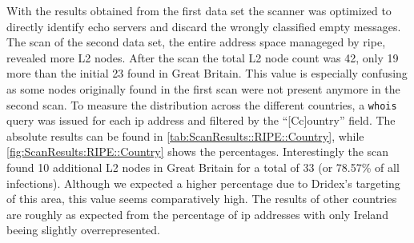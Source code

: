 With the results obtained from the first data set the scanner was optimized to directly identify echo servers and discard the wrongly classified empty messages.
The scan of the second data set, the entire address space manageged by \gls{ripe}, revealed more L2 nodes.
After the scan the total L2 node count was 42, only 19 more than the initial 23 found in Great Britain.
This value is especially confusing as some nodes originally found in the first scan were not present anymore in the second scan.
To measure the distribution across the different countries, a \lstinline|whois| query was issued for each \gls{ip} address and filtered by the ``[Cc]ountry'' field.
The absolute results can be found in \autoref{tab:ScanResults::RIPE::Country}, while \autoref{fig:ScanResults:RIPE::Country} shows the percentages.
Interestingly the scan found 10 additional L2 nodes in Great Britain for a total of 33 (or 78.57\% of all infections).
Although we expected a higher percentage due to Dridex's targeting of this area, this value seems comparatively high.
The results of other countries are roughly as expected from the percentage of \gls{ip} addresses with only Ireland beeing slightly overrepresented.

